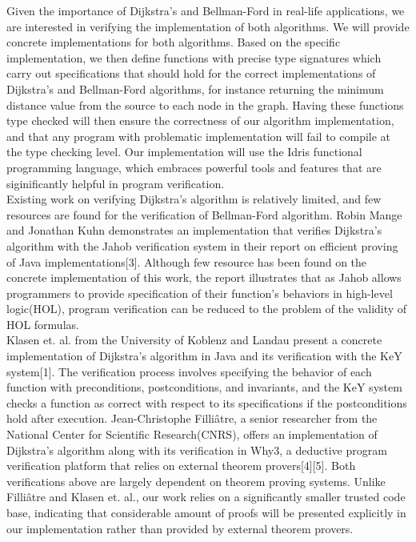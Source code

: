 \documentclass[11pt, a4paper]{article} %
\theoremstyle{definition}
\begin{document}
Given the importance of Dijkstra's and Bellman-Ford in real-life applications, we are interested in verifying the implementation of both algorithms. We will provide concrete implementations for both algorithms. Based on the specific implementation, we then define functions with precise type signatures which carry out specifications that should hold for the correct implementations of Dijkstra's and Bellman-Ford algorithms, for instance returning the minimum distance value from the source to each node in the graph. Having these functions type checked will then ensure the correctness of our algorithm implementation, and that any program with problematic implementation will fail to compile at the type checking level. Our implementation will use the Idris functional programming language, which embraces powerful tools and features that are siginificantly helpful in program verification.
\\

Existing work on verifying Dijkstra's algorithm is relatively limited, and few resources are found for the verification of Bellman-Ford algorithm. Robin Mange and Jonathan Kuhn demonstrates an implementation that verifies Dijkstra's algorithm with the Jahob verification system in their report on efficient proving of Java implementations[3]. Although few resource has been found on the concrete implementation of this work, the report illustrates that as Jahob allows programmers to provide specification of their function's behaviors in high-level logic(HOL), program verification can be reduced to the problem of the validity of HOL formulas. 
\\

Klasen et. al. from the University of Koblenz and Landau present a concrete implementation of Dijkstra's algorithm in Java and its verification with the KeY system[1]. The verification process involves specifying the behavior of each function with preconditions, postconditions, and invariants, and the KeY system checks a function as correct with respect to its specifications if the postconditions hold after execution. Jean-Christophe Filliâtre, a senior researcher from the National Center for Scientific Research(CNRS), offers an implementation of Dijkstra's algorithm along with its verification in Why3, a deductive program verification platform that relies on external theorem provers[4][5]. Both verifications above are largely dependent on theorem proving systems. Unlike Filliâtre and Klasen et. al., our work relies on a significantly smaller trusted code base, indicating that considerable amount of proofs will be presented explicitly in our implementation rather than provided by external theorem provers.
\end{document}
